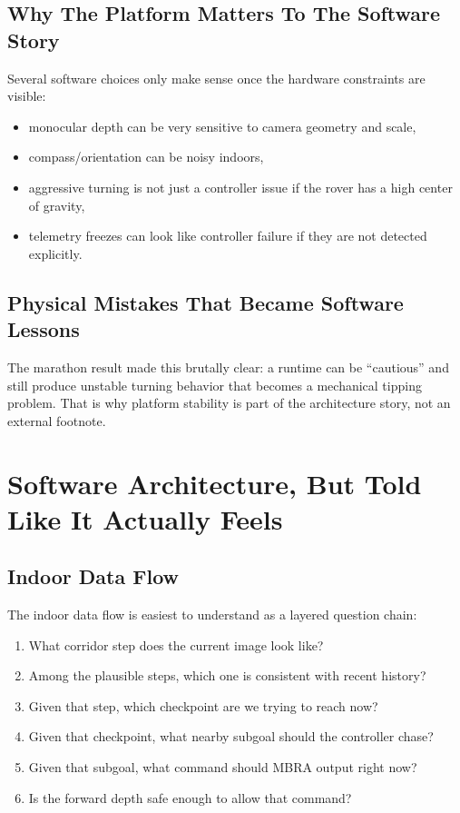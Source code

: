 \documentclass[11pt]{article}
\begin{document}
\subsection{Why The Platform Matters To The Software Story}

Several software choices only make sense once the hardware constraints are visible:

\begin{itemize}[nosep]
  \item monocular depth can be very sensitive to camera geometry and scale,
  \item compass/orientation can be noisy indoors,
  \item aggressive turning is not just a controller issue if the rover has a high
  center of gravity,
  \item telemetry freezes can look like controller failure if they are not detected
  explicitly.
\end{itemize}

\subsection{Physical Mistakes That Became Software Lessons}

The marathon result made this brutally clear: a runtime can be ``cautious'' and
still produce unstable turning behavior that becomes a mechanical tipping problem.
That is why platform stability is part of the architecture story, not an external
footnote.

\section{Software Architecture, But Told Like It Actually Feels}

\subsection{Indoor Data Flow}

The indoor data flow is easiest to understand as a layered question chain:

\begin{enumerate}[nosep]
  \item What corridor step does the current image look like?
  \item Among the plausible steps, which one is consistent with recent history?
  \item Given that step, which checkpoint are we trying to reach now?
  \item Given that checkpoint, what nearby subgoal should the controller chase?
  \item Given that subgoal, what command should MBRA output right now?
  \item Is the forward depth safe enough to allow that command?
\end{enumerate}
\end{document}
